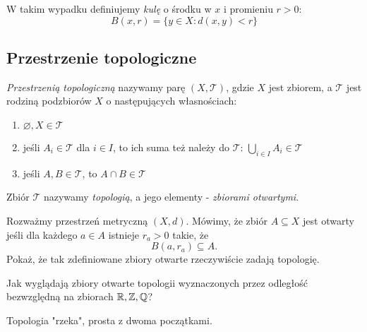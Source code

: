 W takim wypadku definiujemy \emph{kulę} o środku w $x$ i promieniu $r>0$:
$$B(x, r)=\{y\in X : d(x,y) < r\}$$


\subsection{Przestrzenie topologiczne}
\emph{Przestrzenią topologiczną} nazywamy parę $(X, \mathcal T)$, gdzie $X$ jest zbiorem, a $\mathcal T$ jest rodziną podzbiorów $X$ o następujących własnościach:
\begin{enumerate}
  \item $\varnothing, X\in \mathcal T$
  \item jeśli $A_i\in \mathcal T$ dla $i\in I$, to ich suma też należy do $\mathcal T$: $\bigcup_{i\in I}A_i\in \mathcal T$
  \item jeśli $A,B\in \mathcal T$, to $A\cap B\in\mathcal T$
\end{enumerate}
Zbiór $\mathcal T$ nazywamy \emph{topologią}, a jego elementy - \emph{zbiorami otwartymi}.


\begin{prob}
  Rozważmy przestrzeń metryczną $(X, d)$. Mówimy, że zbiór $A\subseteq X$ jest otwarty jeśli dla każdego $a\in A$ istnieje $r_a>0$ takie, że
  $$B(a,r_a)\subseteq A.$$
  Pokaż, że tak zdefiniowane zbiory otwarte rzeczywiście zadają topologię.
\end{prob}

\begin{prob}
  Jak wyglądają zbiory otwarte topologii wyznaczonych przez odległość bezwzględną na zbiorach $\mathbb{R}, \mathbb{Z}, \mathbb{Q}$?
\end{prob}

\begin{example}
  Topologia "rzeka", prosta z dwoma początkami.
\end{example}


